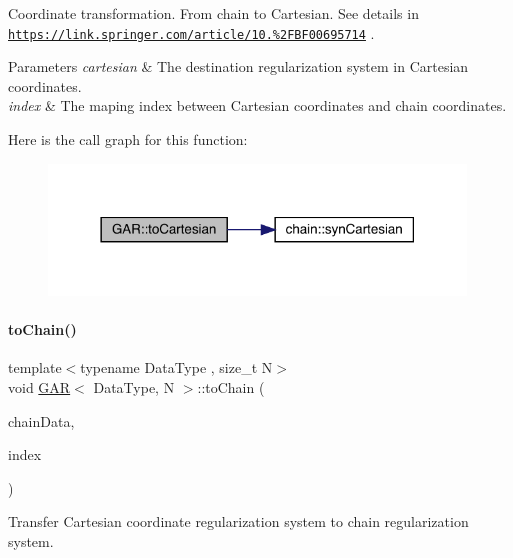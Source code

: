 Coordinate transformation. From chain to Cartesian. See details in \href{https://link.springer.com/article/10.1007%2FBF00695714}{\tt https\+://link.\+springer.\+com/article/10.\%2\+F\+B\+F00695714} . 
\begin{DoxyParams}{Parameters}
{\em cartesian} & The destination regularization system in Cartesian coordinates. \\
\hline
{\em index} & The maping index between Cartesian coordinates and chain coordinates. \\
\hline
\end{DoxyParams}
Here is the call graph for this function\+:\nopagebreak
\begin{figure}[H]
\begin{center}
\leavevmode
\includegraphics[width=314pt]{class_g_a_r_a2a282218e90ffb1a367da364b70e54a3_cgraph}
\end{center}
\end{figure}
\mbox{\label{class_g_a_r_a18041ac48dc47e6ada3e8a33893b1200}} 
\paragraph{\texorpdfstring{to\+Chain()}{toChain()}}
{\footnotesize\ttfamily template$<$typename Data\+Type , size\+\_\+t N$>$ \\
void \mbox{\hyperlink{class_g_a_r}{G\+AR}}$<$ Data\+Type, N $>$\+::to\+Chain (\begin{DoxyParamCaption}\item[{\mbox{\hyperlink{class_g_a_r}{G\+AR}}$<$ Data\+Type, N $>$ \&}]{chain\+Data,  }\item[{\mbox{\hyperlink{class_g_a_r_aaf033049c0cd8f0f86a82b9595086fa5}{Index\+Array}} \&}]{index }\end{DoxyParamCaption})\hspace{0.3cm}{\ttfamily [inline]}}



Transfer Cartesian coordinate regularization system to chain regularization system. 

